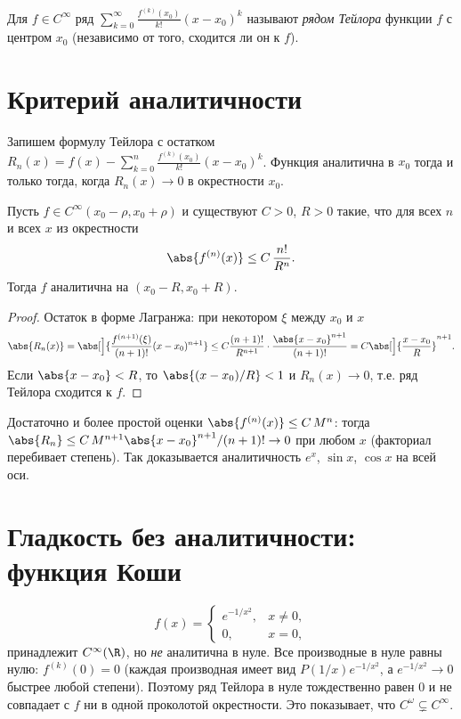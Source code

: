 \begin{definition}
Для $f\in C^\infty$ ряд $\displaystyle\sum_{k=0}^\infty\frac{f^{(k)}(x_0)}{k!}(x-x_0)^k$ называют
\emph{рядом Тейлора} функции $f$ с центром $x_0$ (независимо от того, сходится ли он к $f$).
\end{definition}

\section{Критерий аналитичности}

Запишем формулу Тейлора с остатком $R_n(x)=f(x)-\sum_{k=0}^n\frac{f^{(k)}(x_0)}{k!}(x-x_0)^k$.
Функция аналитична в $x_0$ тогда и только тогда, когда $R_n(x)\to0$ в окрестности $x_0$.

\begin{theorem}
Пусть $f\in C^\infty(x_0-\rho,x_0+\rho)$ и существуют $C>0$, $R>0$ такие, что для всех $n$ и всех
$x$ из окрестности
\[
  \abs{f^{(n)}(x)}\le C\,\frac{n!}{R^n}.
\]
Тогда $f$ аналитична на $(x_0-R,x_0+R)$.
\end{theorem}

\begin{proof}
Остаток в форме Лагранжа: при некотором $\xi$ между $x_0$ и $x$
\[
  \abs{R_n(x)}=\abs[\Big]{\frac{f^{(n+1)}(\xi)}{(n+1)!}(x-x_0)^{n+1}}
   \le C\frac{(n+1)!}{R^{n+1}}\cdot\frac{\abs{x-x_0}^{n+1}}{(n+1)!}
   =C\abs[\Big]{\frac{x-x_0}{R}}^{n+1}.
\]
Если $\abs{x-x_0}<R$, то $\abs{(x-x_0)/R}<1$ и $R_n(x)\to0$, т.е. ряд Тейлора сходится к $f$.
\end{proof}

\begin{remark}
Достаточно и более простой оценки $\abs{f^{(n)}(x)}\le C\,M^{n}$: тогда
$\abs{R_n}\le C\,M^{n+1}\abs{x-x_0}^{n+1}/(n+1)!\to0$ при любом $x$ (факториал перебивает
степень). Так доказывается аналитичность $e^x$, $\sin x$, $\cos x$ на всей оси.
\end{remark}

\section{Гладкость без аналитичности: функция Коши}

\begin{example}
\[
  f(x)=\begin{cases}e^{-1/x^2},& x\ne0,\\ 0,& x=0,\end{cases}
\]
принадлежит $C^\infty(\R)$, но \emph{не} аналитична в нуле. Все производные в нуле равны нулю:
$f^{(k)}(0)=0$ (каждая производная имеет вид $P(1/x)e^{-1/x^2}$, а $e^{-1/x^2}\to0$ быстрее любой
степени). Поэтому ряд Тейлора в нуле тождественно равен $0$ и не совпадает с $f$ ни в одной
проколотой окрестности. Это показывает, что $C^\omega\subsetneq C^\infty$.
\end{example}

